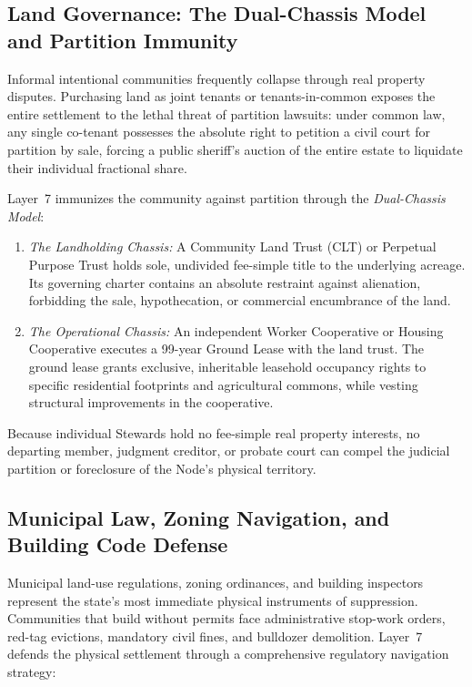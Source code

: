 \subsection{Land Governance: The Dual-Chassis Model and Partition Immunity}

Informal intentional communities frequently collapse through real property disputes. Purchasing land as joint tenants or tenants-in-common exposes the entire settlement to the lethal threat of partition lawsuits: under common law, any single co-tenant possesses the absolute right to petition a civil court for partition by sale, forcing a public sheriff's auction of the entire estate to liquidate their individual fractional share.

Layer~7 immunizes the community against partition through the \textit{Dual-Chassis Model}:
\begin{enumerate}
  \item \textit{The Landholding Chassis:} A Community Land Trust (CLT) or Perpetual Purpose Trust holds sole, undivided fee-simple title to the underlying acreage. Its governing charter contains an absolute restraint against alienation, forbidding the sale, hypothecation, or commercial encumbrance of the land.
  \item \textit{The Operational Chassis:} An independent Worker Cooperative or Housing Cooperative executes a 99-year Ground Lease with the land trust. The ground lease grants exclusive, inheritable leasehold occupancy rights to specific residential footprints and agricultural commons, while vesting structural improvements in the cooperative.
\end{enumerate}
Because individual Stewards hold no fee-simple real property interests, no departing member, judgment creditor, or probate court can compel the judicial partition or foreclosure of the Node's physical territory.

\subsection{Municipal Law, Zoning Navigation, and Building Code Defense}
\label{sec:l7-municipal}

Municipal land-use regulations, zoning ordinances, and building inspectors represent the state's most immediate physical instruments of suppression. Communities that build without permits face administrative stop-work orders, red-tag evictions, mandatory civil fines, and bulldozer demolition. Layer~7 defends the physical settlement through a comprehensive regulatory navigation strategy:

